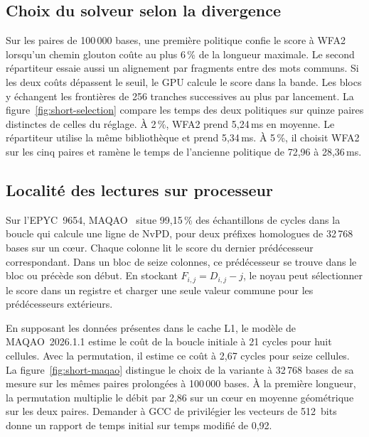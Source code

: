\subsection{Choix du solveur selon la divergence}
Sur les paires de 100\,000 bases, une première politique confie le score à WFA2 lorsqu’un chemin glouton coûte au plus 6\,\% de la longueur maximale. Le second répartiteur essaie aussi un alignement par fragments entre des mots communs. Si les deux coûts dépassent le seuil, le GPU calcule le score dans la bande. Les blocs y échangent les frontières de 256 tranches successives au plus par lancement. La figure~\ref{fig:short-selection} compare les temps des deux politiques sur quinze paires distinctes de celles du réglage.
À 2\,\%, WFA2 prend 5,24\,ms en moyenne. Le répartiteur utilise la même bibliothèque et prend 5,34\,ms. À 5\,\%, il choisit WFA2 sur les cinq paires et ramène le temps de l’ancienne politique de 72,96 à 28,36\,ms.

\subsection{Localité des lectures sur processeur}
Sur l’EPYC~9654, MAQAO~\cite{maqao} situe 99,15\,\% des échantillons de cycles dans la boucle qui calcule une ligne de NvPD, pour deux préfixes homologues de 32\,768 bases sur un cœur. Chaque colonne lit le score du dernier prédécesseur correspondant. Dans un bloc de seize colonnes, ce prédécesseur se trouve dans le bloc ou précède son début. En stockant \(F_{i,j}=D_{i,j}-j\), le noyau peut sélectionner le score dans un registre et charger une seule valeur commune pour les prédécesseurs extérieurs.

En supposant les données présentes dans le cache L1, le modèle de MAQAO~2026.1.1 estime le coût de la boucle initiale à 21 cycles pour huit cellules. Avec la permutation, il estime ce coût à 2,67 cycles pour seize cellules. La figure~\ref{fig:short-maqao} distingue le choix de la variante à 32\,768 bases de sa mesure sur les mêmes paires prolongées à 100\,000 bases. À la première longueur, la permutation multiplie le débit par 2,86 sur un cœur en moyenne géométrique sur les deux paires. Demander à GCC de privilégier les vecteurs de 512~bits donne un rapport de temps initial sur temps modifié de 0,92.

